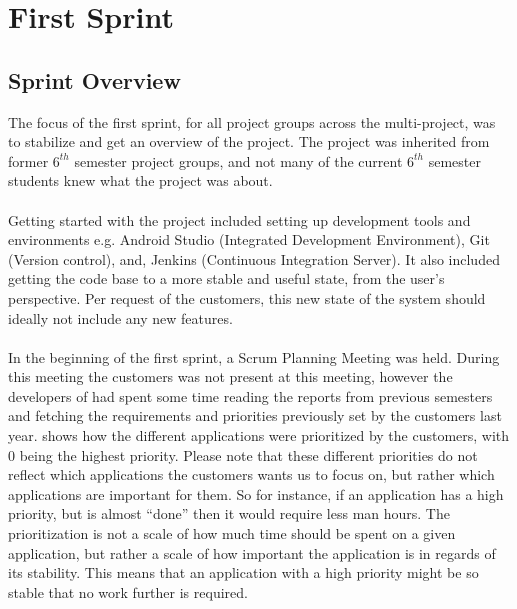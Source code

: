 \part{First Sprint}
\label{par:first_sprint}

\chapter{Sprint Overview}
The focus of the first sprint, for all project groups across the multi-project, was to stabilize and get an overview of the project. The project was inherited from former $6^{th}$ semester project groups, and not many of the current $6^{th}$ semester students knew what the \giraf project was about.
\\\\
Getting started with the project included setting up development tools and environments e.g. Android Studio (Integrated Development Environment), Git (Version control), and, Jenkins (Continuous Integration Server). It also included getting the code base to a more stable and useful state, from the user's perspective. Per request of the customers, this new state of the system should ideally not include any new features.
\\\\
In the beginning of the first sprint, a Scrum Planning Meeting was held. During this meeting the customers was not present at this meeting, however the developers of \giraf had spent some time reading the reports from previous semesters and fetching the requirements and priorities previously set by the customers last year.  shows how the different applications were prioritized by the customers, with 0 being the highest priority. Please note that these different priorities do not reflect which applications the customers wants us to focus on, but rather which applications are important for them. So for instance, if an application has a high priority, but is almost ``done'' then it would require less man hours. The prioritization is not a scale of how much time should be spent on a given application, but rather a scale of how important the application is in regards of its stability. This means that an application with a high priority might be so stable that no work further is required.


